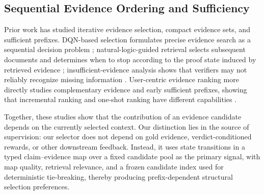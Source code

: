 \documentclass[letterpaper]{article}
\begin{document}
\subsection{Sequential Evidence Ordering and Sufficiency}

Prior work has studied iterative evidence selection, compact evidence sets, and sufficient prefixes. DQN-based selection formulates precise evidence search as a sequential decision problem \citep{Wan2021DQN}; natural-logic-guided retrieval selects subsequent documents and determines when to stop according to the proof state induced by retrieved evidence \citep{Aly2022NaturalLogic}; insufficient-evidence analysis shows that verifiers may not reliably recognize missing information \citep{Atanasova2022Insufficient}. User-centric evidence ranking more directly studies complementary evidence and early sufficient prefixes, showing that incremental ranking and one-shot ranking have different capabilities \citep{Alt2026EvidenceRanking}.

Together, these studies show that the contribution of an evidence candidate depends on the currently selected context. Our distinction lies in the source of supervision: our selector does not depend on gold evidence, verdict-conditioned rewards, or other downstream feedback. Instead, it uses state transitions in a typed claim--evidence map over a fixed candidate pool as the primary signal, with map quality, retrieval relevance, and a frozen candidate index used for deterministic tie-breaking, thereby producing prefix-dependent structural selection preferences.




\end{document}

